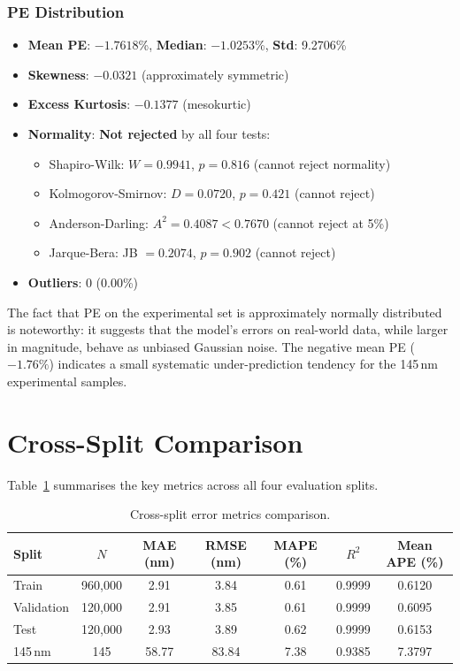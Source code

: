 \documentclass[11pt,a4paper]{article}
\begin{document}
\subsubsection{PE Distribution}

\begin{itemize}
  \item \textbf{Mean PE}: $-1.7618$\%, \textbf{Median}: $-1.0253$\%, \textbf{Std}: 9.2706\%
  \item \textbf{Skewness}: $-0.0321$ (approximately symmetric)
  \item \textbf{Excess Kurtosis}: $-0.1377$ (mesokurtic)
  \item \textbf{Normality}: \textbf{Not rejected} by all four tests:
  \begin{itemize}
    \item Shapiro-Wilk: $W = 0.9941$, $p = 0.816$ \hfill (cannot reject normality)
    \item Kolmogorov-Smirnov: $D = 0.0720$, $p = 0.421$ \hfill (cannot reject)
    \item Anderson-Darling: $A^2 = 0.4087 < 0.7670$ \hfill (cannot reject at 5\%)
    \item Jarque-Bera: JB $= 0.2074$, $p = 0.902$ \hfill (cannot reject)
  \end{itemize}
  \item \textbf{Outliers}: 0 (0.00\%)
\end{itemize}

The fact that PE on the experimental set is approximately normally distributed is noteworthy: it suggests that the model's errors on real-world data, while larger in magnitude, behave as unbiased Gaussian noise. The negative mean PE ($-1.76\%$) indicates a small systematic under-prediction tendency for the 145\,nm experimental samples.

\section{Cross-Split Comparison}

Table~\ref{tab:comparison} summarises the key metrics across all four evaluation splits.

\begin{table}[H]
\centering
\caption{Cross-split error metrics comparison.}
\label{tab:comparison}
\begin{tabular}{lcccccc}
\toprule
\textbf{Split} & \textbf{$N$} & \textbf{MAE (nm)} & \textbf{RMSE (nm)} & \textbf{MAPE (\%)} & \textbf{$R^2$} & \textbf{Mean APE (\%)} \\
\midrule
Train      & 960,000 & 2.91 & 3.84 & 0.61 & 0.9999 & 0.6120 \\
Validation & 120,000 & 2.91 & 3.85 & 0.61 & 0.9999 & 0.6095 \\
Test       & 120,000 & 2.93 & 3.89 & 0.62 & 0.9999 & 0.6153 \\
145\,nm    &     145 & 58.77 & 83.84 & 7.38 & 0.9385 & 7.3797 \\
\bottomrule
\end{tabular}
\end{table}
\end{document}
